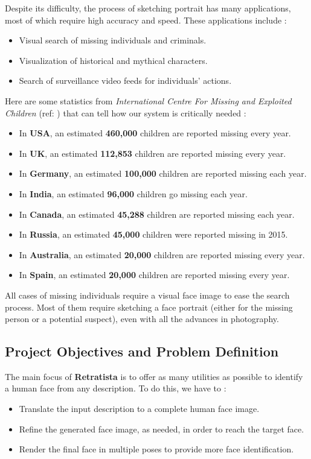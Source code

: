 Despite its difficulty, the process of sketching portrait has many applications, most of which require high accuracy and speed. These applications include :
\begin{itemize}
    \item Visual search of missing individuals and criminals.
    \item Visualization of historical and mythical characters.
    \item Search of surveillance video feeds for individuals' actions.
\end{itemize}

Here are some statistics from \emph{International Centre For Missing and Exploited Children} (ref: ) that can tell how our system is critically needed :

\begin{itemize}
    \item In \textbf{USA}, an estimated \textbf{460,000} children are reported missing every year.
    \item In \textbf{UK}, an estimated \textbf{112,853} children are reported missing every year.
    \item In \textbf{Germany}, an estimated \textbf{100,000} children are reported missing each year.
    \item In \textbf{India}, an estimated \textbf{96,000} children go missing each year.
    \item In \textbf{Canada}, an estimated \textbf{45,288} children are reported missing each year.
    \item In \textbf{Russia}, an estimated \textbf{45,000} children were reported missing in 2015.
    \item In \textbf{Australia}, an estimated \textbf{20,000} children are reported missing every year.
    \item In \textbf{Spain}, an estimated \textbf{20,000} children are reported missing every year.
\end{itemize}

All cases of missing individuals require a visual face image to ease the search process. Most of them require sketching a face portrait (either for the missing person or a potential suspect), even with all the advances in photography.

\subsection{Project Objectives and Problem Definition}
The main focus of \textbf{Retratista} is to offer as many utilities as possible to identify a human face from any description. To do this, we have to :
\begin{itemize}
    \item Translate the input description to a complete human face image.
    \item Refine the generated face image, as needed, in order to reach the target face.
    \item Render the final face in multiple poses to provide more face identification.
\end{itemize}

